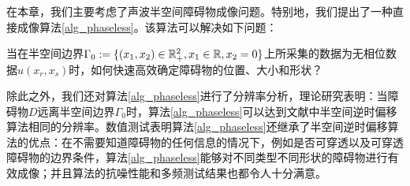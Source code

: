 在本章，我们主要考虑了声波半空间障碍物成像问题。特别地，我们提出了一种直接成像算法\ref{alg_phaseless}。该算法可以解决如下问题：

当在半空间边界$\Gamma_0:=\{(x_1,x_2)\in\mathbb{R}^2_+,x_1\in\mathbb{R},x_2=0\}$上所采集的数据为无相位数据$u(x_r,x_s)$时，如何快速高效确定障碍物的位置、大小和形状？

除此之外，我们还对算法\ref{alg_phaseless}进行了分辨率分析，理论研究表明：当障碍物$D$远离半空间边界$\Gamma_0$时，算法\ref{alg_phaseless}可以达到文献\cite{ch_ha}中半空间逆时偏移算法相同的分辨率。数值测试表明算法\ref{alg_phaseless}还继承了半空间逆时偏移算法的优点：在不需要知道障碍物的任何信息的情况下，例如是否可穿透以及可穿透障碍物的边界条件，算法\ref{alg_phaseless}能够对不同类型不同形状的障碍物进行有效成像；并且算法的抗噪性能和多频测试结果也都令人十分满意。